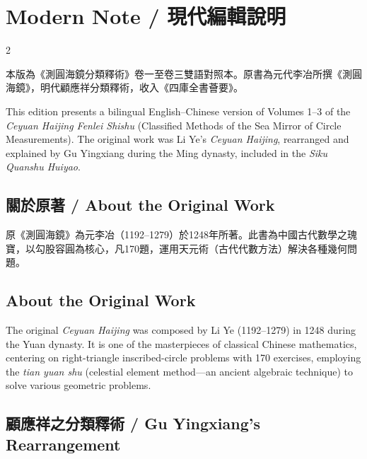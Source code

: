 \documentclass[11pt,a4paper]{article}
\newcounter{problem}[section]
\begin{document}
\clearpage

\section*{Modern Note / 現代編輯說明}

\begin{paracol}{2}

本版為《測圓海鏡分類釋術》卷一至卷三雙語對照本。原書為元代李冶所撰《測圓海鏡》，明代顧應祥分類釋術，收入《四庫全書薈要》。

\switchcolumn

This edition presents a bilingual English--Chinese version of Volumes 1--3 of the \textit{Ceyuan Haijing Fenlei Shishu} (Classified Methods of the Sea Mirror of Circle Measurements). The original work was Li Ye's \textit{Ceyuan Haijing}, rearranged and explained by Gu Yingxiang during the Ming dynasty, included in the \textit{Siku Quanshu Huiyao}.

\switchcolumn

\subsection*{關於原著 / About the Original Work}

原《測圓海鏡》為元李冶（1192--1279）於1248年所著。此書為中國古代數學之瑰寶，以勾股容圓為核心，凡170題，運用天元術（古代代數方法）解決各種幾何問題。

\switchcolumn

\subsection*{About the Original Work}

The original \textit{Ceyuan Haijing} was composed by Li Ye (1192--1279) in 1248 during the Yuan dynasty. It is one of the masterpieces of classical Chinese mathematics, centering on right-triangle inscribed-circle problems with 170 exercises, employing the \textit{tian yuan shu} (celestial element method---an ancient algebraic technique) to solve various geometric problems.

\switchcolumn

\subsection*{顧應祥之分類釋術 / Gu Yingxiang's Rearrangement}


\end{paracol}
\end{document}
